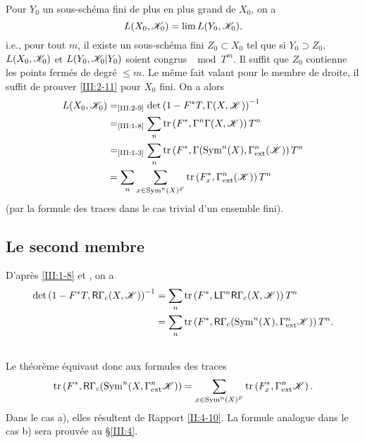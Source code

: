 Pour $Y_0$ un sous-schéma fini de plus en plus grand de $X_0$, on a 
\[
  L(X_0,\mathscr{K}_0) = \lim L(Y_0,\mathscr{K}_0) \text{,}
\]
i.e., pour tout $m$, il existe un sous-schéma fini $Z_0\subset X_0$ tel que 
si $Y_0\supset Z_0$, $L(X_0,\mathscr{K}_0)$ et $L(Y_0,\mathscr{K}_0|Y_0)$ soient congrus 
$\mod T^m$. 
Il suffit que $Z_0$ contienne les points fermés de degré $\leqslant m$. 
Le même fait valant pour le membre de droite, il suffit de prouver 
\ref{III:2-11} pour $X_0$ fini. On a alors 
\begin{align*}
  L(X_0,\mathscr{K}_0) 
    &=_\text{\ref{III:2-9}} \det\left(1-F^* T,\Gamma(X,\mathscr{K})\right)^{-1} \\
    &=_\text{\ref{III:1-8}} \sum_n \operatorname{tr}\left(F^*,\Gamma^n \Gamma(X,\mathscr{K})\right) T^n \\
    &=_\text{\ref{III:1-3}} \sum_n \operatorname{tr}\left(F^*,\Gamma(\operatorname{Sym}^n(X),\Gamma_\text{ext}^n(\mathscr{K})\right) T^n \\
    &= \sum_n \sum_{x\in \operatorname{Sym}^n(X)^F} \operatorname{tr}\left(F_x^*,\Gamma_\text{ext}^n(\mathscr{K})\right) T^n
\end{align*}
(par la formule des traces dans le cas trivial d'un ensemble fini). 





\subsection{Le second membre}\label{III:2-12}

D'après \ref{III:1-8} et \cite[XVII 5.5.12]{sga4}, on a 
\begin{align*}
  \det\left(1-F^* T,\mathsf{R}\Gamma_c(X,\mathscr{K})\right)^{-1} 
    &= \sum_n \operatorname{tr}\left(F^*,\mathsf{L}\Gamma^n\mathsf{R}\Gamma_c(X,\mathscr{K})\right) T^n \\
    &= \sum_n \operatorname{tr}\left(F^*,\mathsf{R}\Gamma_c(\operatorname{Sym}^n(X),\Gamma_\text{ext}^n\mathscr{K})\right) T^n \text{.}
\end{align*}





\subsection{}\label{III:2-13}

Le théorème équivaut donc aux formules des traces 
\[
  \operatorname{tr}\left(F^*,\mathsf{R}\Gamma_c(\operatorname{Sym}^n(X,\Gamma_\text{ext}^n \mathscr{K})\right) = \sum_{x\in\operatorname{Sym}^n(X)^F} \operatorname{tr}\left(F_x^*,\Gamma_\text{ext}^n\mathscr{K}\right) \text{.}
\]
Dans le cas a), elles résultent de Rapport \ref{II:4-10}. La formule 
analogue dans le cas b) sera prouvée au \S\ref{III:4}. 










